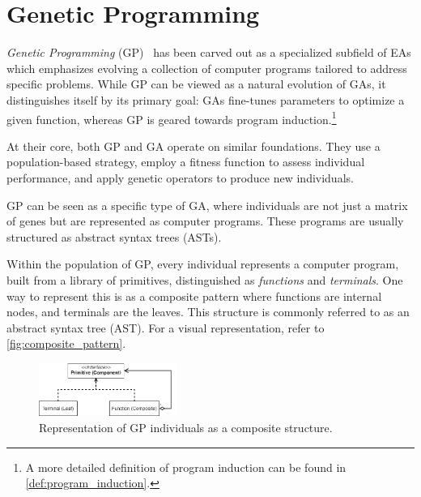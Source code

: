 \section{Genetic Programming}
\label{sec:bg:gp}

  \emph{Genetic Programming} (GP)~\autocite{kozaGeneticProgrammingProgramming1992a,kozaGeneticProgrammingII1994,poliFieldGuideGenetic2008a,yuIntroductionEvolutionaryAlgorithms2010}
  has been carved out as a specialized subfield of EAs which emphasizes 
  evolving a collection of computer programs tailored to address specific 
  problems. While GP can be viewed as a natural evolution of 
  GAs, it distinguishes itself by its primary goal: GAs fine-tunes parameters 
  to optimize a given function, whereas GP is geared towards program induction.\footnote{%
    A more detailed definition of program induction can be found in \vref{def:program_induction}.
  }

  
  At their core, both GP and GA operate on similar foundations. They use a population-based strategy, employ a fitness 
  function to assess individual performance, and apply genetic operators to produce new individuals.

  \begin{remark}
    GP can be seen as a specific type of GA, where individuals are not just a matrix of genes but are represented as 
    computer programs. These programs are usually structured as abstract syntax trees (ASTs).
  \end{remark}

  Within the population of GP, every individual represents a computer program, built from a library of primitives, 
  distinguished as \emph{functions} and \emph{terminals}. One way to represent this is as a composite pattern where 
  functions are internal nodes, and terminals are the leaves. This structure is commonly referred to as an abstract 
  syntax tree (AST). For a visual representation, refer to \vref{fig:composite_pattern}.

  \begin{figure}[ht!]
    \centering
    \includegraphics[width=0.4\textwidth]
      {img/theoretical_framework/GP Composite.png}
    \caption{
      Representation of GP individuals as a composite structure.
    }
    \label{fig:composite_pattern}
  \end{figure}

